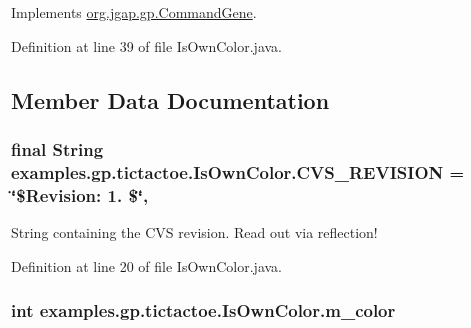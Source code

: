 Implements \hyperlink{classorg_1_1jgap_1_1gp_1_1_command_gene_a236141d99059da808afe7a9217e411c7}{org.\-jgap.\-gp.\-Command\-Gene}.



Definition at line 39 of file Is\-Own\-Color.\-java.



\subsection{Member Data Documentation}
\hypertarget{classexamples_1_1gp_1_1tictactoe_1_1_is_own_color_a129ccb3c2a69b0b736a3d09f2c7982ed}{
\subsubsection[{C\-V\-S\-\_\-\-R\-E\-V\-I\-S\-I\-O\-N}]{\setlength{\rightskip}{0pt plus 5cm}final String examples.\-gp.\-tictactoe.\-Is\-Own\-Color.\-C\-V\-S\-\_\-\-R\-E\-V\-I\-S\-I\-O\-N = \char`\"{}\$Revision\-: 1. \$\char`\"{}\hspace{0.3cm}{\ttfamily [static]}, {\ttfamily [private]}}}\label{classexamples_1_1gp_1_1tictactoe_1_1_is_own_color_a129ccb3c2a69b0b736a3d09f2c7982ed}
String containing the C\-V\-S revision. Read out via reflection! 

Definition at line 20 of file Is\-Own\-Color.\-java.

\hypertarget{classexamples_1_1gp_1_1tictactoe_1_1_is_own_color_af546abf4132ca7d0fcb093b4a9b04f00}{
\subsubsection[{m\-\_\-color}]{\setlength{\rightskip}{0pt plus 5cm}int examples.\-gp.\-tictactoe.\-Is\-Own\-Color.\-m\-\_\-color\hspace{0.3cm}{\ttfamily [private]}}}\label{classexamples_1_1gp_1_1tictactoe_1_1_is_own_color_af546abf4132ca7d0fcb093b4a9b04f00}


